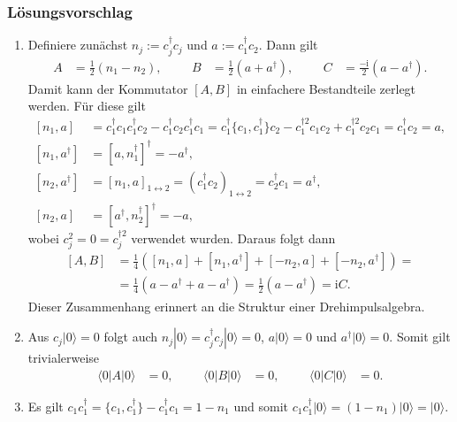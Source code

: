 \documentclass[german, parskip=full]{scrartcl}
\newcommand{\braket}{}
\newcommand{\kla}{}
\newcommand{\klam}{}
\newcommand{\Ket}{}
\newcommand{\I}{\text{i}}
\begin{document}
\subsubsection*{Lösungsvorschlag}
\begin{enumerate}
\item[a)] Definiere zunächst $n_j:=c_j^\dagger c_j$ und $a:=c_1^\dagger c_2$.
Dann gilt
\begin{align*}
A&=\frac{1}{2}\kla\left( {n_1-n_2} \right),&&&B&=\frac{1}{2}\kla\left( {a+a^\dagger} \right),&&&C&=\frac{-\I}{2}\kla\left( {a-a^\dagger} \right).
\end{align*}
Damit kann der Kommutator $[A,B]$ in einfachere Bestandteile zerlegt werden.
Für diese gilt
\begin{align*}
\klam\left[ {n_1,a} \right]&=c_1^\dagger c_1c_1^\dagger c_2-c_1^\dagger c_2c_1^\dagger c_1=c_1^\dagger \{c_1, c_1^\dagger\}c_2-c_1^{\dagger 2}c_1c_2+c_1^{\dagger 2}c_2c_1=c_1^\dagger c_2=a,\\
\klam\left[ {n_1,a^\dagger} \right]&=\klam\left[ {a,n_1^\dagger} \right]^\dagger=-a^\dagger,\\
\klam\left[ {n_2,a^\dagger} \right]&=\klam\left[ {n_1,a} \right]_{1\leftrightarrow 2}=(c_1^\dagger c_2)_{1\leftrightarrow 2}=c_2^\dagger c_1=a^\dagger,\\
\klam\left[ {n_2,a} \right]&=\klam\left[ {a^\dagger,n_2^\dagger} \right]^\dagger = -a,
\end{align*}
wobei $c_j^2=0=c_j^{\dagger 2}$ verwendet wurden. 
Daraus folgt dann 
\begin{align*}
\klam\left[ {A,B} \right]&=\frac{1}{4}\kla\left( {\klam\left[ {n_1,a} \right]+\klam\left[ {n_1,a^\dagger} \right]+\klam\left[ {-n_2,a} \right]+\klam\left[ {-n_2,a^\dagger} \right]} \right)=\\
&=\frac{1}{4}\kla\left( {a-a^\dagger +a-a^\dagger} \right)=\frac{1}{2}\kla\left( {a-a^\dagger} \right)=\I C.
\end{align*}
Dieser Zusammenhang erinnert an die Struktur einer Drehimpulsalgebra.
\item[b)] Aus $c_j |0\rangle = 0$ folgt auch $n_j\Ket | {0} \rangle=c_j^\dagger c_j\Ket | {0} \rangle=0$, $a\Ket | {0} \rangle=0$ und $a^\dagger\Ket | {0} \rangle=0$.
Somit gilt trivialerweise
\begin{align}
\braket\langle {0} | {A} | {0}\rangle&=0,&&&\braket\langle {0} | {B} | {0}\rangle&=0,&&&\braket\langle {0} | {C} | {0}\rangle&=0.
\end{align}
\item[c)] Es gilt $c_1c_1^\dagger = \{c_1,c_1^\dagger\}-c_1^\dagger c_1=1-n_1$ und somit $c_1c_1^\dagger\Ket | {0} \rangle=(1-n_1)\Ket | {0} \rangle=\Ket | {0} \rangle$.

\end{enumerate}
\end{document}
